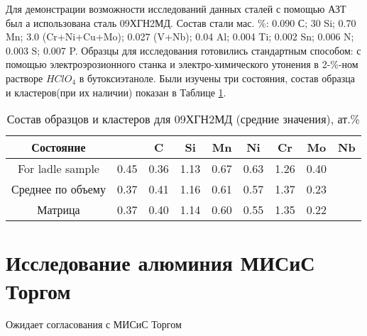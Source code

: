 Для демонстрации возможности исследований данных сталей с помощью АЗТ был а использована сталь 09ХГН2МД. Состав стали мас. \%: 0.090 С; 30 Si; 0.70 Mn; 3.0 (Cr+Ni+Cu+Mo); 0.027 (V+Nb); 0.04 Al; 0.004 Ti; 0.002 Sn; 0.006 N; 0.003 S; 0.007 P. Образцы для исследования готовились стандартным способом: с помощью электроэрозионного станка и электро-химического утонения в 2-\%-ном растворе $HClO_{4}$ в бутоксиэтаноле. Были изучены три состояния,  состав образца и кластеров(при их наличии) показан в Таблице \cref{tab:SteelComposition09X}.


\begin{table} [htbp]
	\centering
	\caption{Состав образцов и кластеров для 09ХГН2МД (средние значения), ат.\%}
	\label{tab:SteelComposition09X}%
	\begin{SingleSpace}
		\begin{tabular}{| c | c | c | c | c | c | c | c | c |}
			\hline
			Состояние & & C & Si & Mn & Ni & Cr & Mo & Nb     \\ \hline
			For ladle sample     & 0.45 & 0.36 & 1.13 & 0.67 & 0.63 & 1.26 & 0.40 &    \\ \hline
			Среднее по объему   & 0.37 & 0.41 & 1.16 & 0.61 & 0.57 & 1.37 & 0.23 &   \\  \hline		
			Матрица   & 0.37 & 0.40 & 1.14 & 0.60 & 0.55 & 1.35 & 0.22 &   \\  \hline		
		\end{tabular}%
	\end{SingleSpace}
\end{table}

\FloatBarrier

\section{Исследование алюминия МИСиС Торгом}\label{sec:ch4/sect4}

Ожидает согласования с МИСиС Торгом

\FloatBarrier
\clearpage










